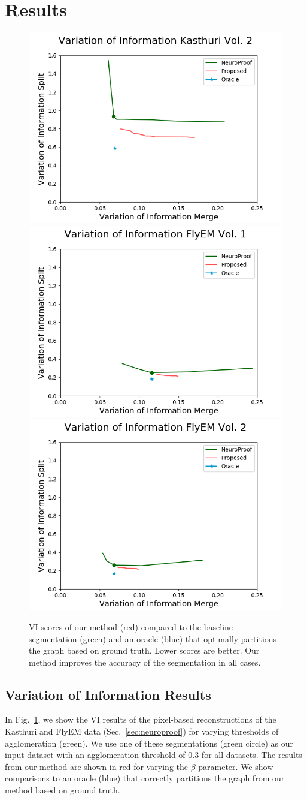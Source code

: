 \section{Results}

\begin{figure}[t!]
	\centering
	\includegraphics[width=0.32\linewidth]{./figures/variation_of_information-microns-test-600.png}
	\includegraphics[width=0.32\linewidth]{./figures/variation_of_information-FlyEM-train-600.png}
	\includegraphics[width=0.32\linewidth]{./figures/variation_of_information-FlyEM-test-600.png}
	\caption{VI scores of our method (red) compared to the baseline segmentation (green) and an oracle (blue) that optimally partitions the graph based on ground truth. Lower scores are better. Our method improves the accuracy of the segmentation in all cases.}
	\label{fig:variation-of-information}
\end{figure}

\subsection{Variation of Information Results}

In Fig.~\ref{fig:variation-of-information}, we show the VI results of the pixel-based reconstructions of the Kasthuri and FlyEM data (Sec.~\ref{sec:neuroproof}) for varying thresholds of agglomeration (green). 
We use one of these segmentations (green circle) as our input dataset with an agglomeration threshold of 0.3 for all datasets. 
The results from our method are shown in red for varying the $\beta$ parameter. 
We show comparisons to an oracle (blue) that correctly partitions the graph from our method based on ground truth.

